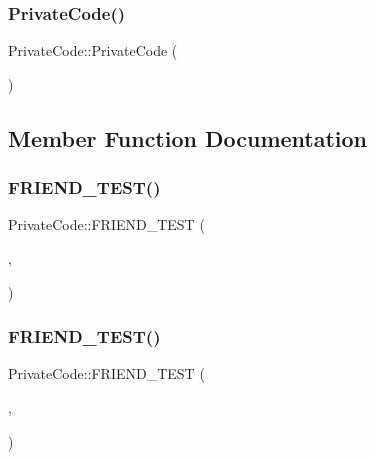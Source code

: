 \mbox{\label{class_private_code_affe538411a99919d24ef09dffe1bb3eb}} 
\subsubsection{\texorpdfstring{PrivateCode()}{PrivateCode()}\hspace{0.1cm}{\footnotesize\ttfamily [3/3]}}
{\footnotesize\ttfamily Private\+Code\+::\+Private\+Code (\begin{DoxyParamCaption}{ }\end{DoxyParamCaption})}



\subsection{Member Function Documentation}
\mbox{\label{class_private_code_a9a74a333501232539ab1636f0928d8f2}} 
\subsubsection{\texorpdfstring{FRIEND\_TEST()}{FRIEND\_TEST()}\hspace{0.1cm}{\footnotesize\ttfamily [1/6]}}
{\footnotesize\ttfamily Private\+Code\+::\+F\+R\+I\+E\+N\+D\+\_\+\+T\+E\+ST (\begin{DoxyParamCaption}\item[{Private\+Code\+Test}]{,  }\item[{Can\+Access\+Private\+Members}]{ }\end{DoxyParamCaption})}

\mbox{\label{class_private_code_a9a74a333501232539ab1636f0928d8f2}} 
\subsubsection{\texorpdfstring{FRIEND\_TEST()}{FRIEND\_TEST()}\hspace{0.1cm}{\footnotesize\ttfamily [2/6]}}
{\footnotesize\ttfamily Private\+Code\+::\+F\+R\+I\+E\+N\+D\+\_\+\+T\+E\+ST (\begin{DoxyParamCaption}\item[{Private\+Code\+Test}]{,  }\item[{Can\+Access\+Private\+Members}]{ }\end{DoxyParamCaption})}

